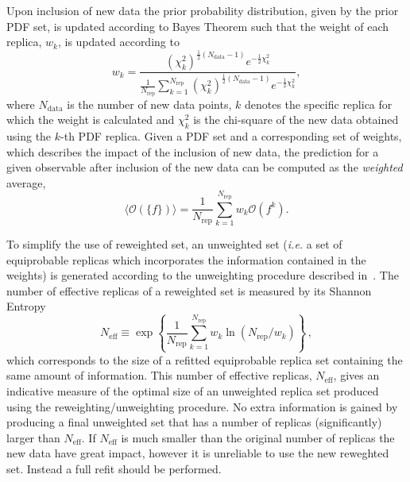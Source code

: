 Upon inclusion of new data the prior probability distribution, given by the prior PDF set, is updated according
to Bayes Theorem such that the weight of each replica, $w_k$, is updated according to
\begin{equation}
 w_k = \frac{(\chi^2_k)^{\frac{1}{2} (N_{\mathrm{data}}-1) } e^{-\frac{1}{2}\chi^2_k}}
          { \frac{1}{N_{\mathrm{rep}}} \sum^{N_{\mathrm{rep}}}_{k=1}(\chi^2_k)^{\frac{1}{2}(N_{\mathrm{data}}-1)} e^{-\frac{1}{2}\chi^2_k}  },
\end{equation}
where $N_{\mathrm{data}}$ is the number of new data points, $k$ denotes the specific replica for which the 
weight is calculated and $\chi^2_k$ is the chi-square of the new data obtained using the $k$-th PDF replica.
Given a PDF set and a corresponding set of weights, which describes the impact of the
inclusion of new data, the prediction for a given observable after inclusion of the new data can be computed as the {\em weighted} average,
\begin{equation}
\langle\mathcal{O}(\{f\})\rangle =  \frac{1}{N_{\mathrm{rep}}} \sum_{k=1}^{N_{\mathrm{rep}}} w_k \mathcal{O}(f^{k}).
\end{equation}

To simplify the use of reweighted set, an unweighted set ({\em i.e.} a set of equiprobable replicas which incorporates 
the information contained in the weights) is generated according to the unweighting procedure described in~\cite{Ball:2011gg}. 
The number of effective replicas of a reweighted set is measured by its Shannon 
Entropy~\cite{Ball:2010gb}
\begin{equation}
\label{eq:shannon}
N_\mathrm{eff}\equiv 
\exp\left\{\frac{1}{N_\mathrm{rep}}\sum_{k=1}^{N_\mathrm{rep}}w_k\ln(N_\mathrm{rep}/w_k)\right\}\,,
\end{equation}
which corresponds to the size of a refitted equiprobable replica set containing the same amount of information. 
This number of effective replicas, $N_\mathrm{eff}$, gives an indicative measure of the optimal size of an 
unweighted replica set produced using the reweighting/unweighting procedure. No extra information is 
gained by producing a final unweighted set that has a number of replicas (significantly) larger than 
$N_\mathrm{eff}$.  If $N_\mathrm{eff}$ is much smaller than the original number of replicas the new data have great impact, however it is unreliable to use the new reweghted set. Instead a full refit should be performed.


